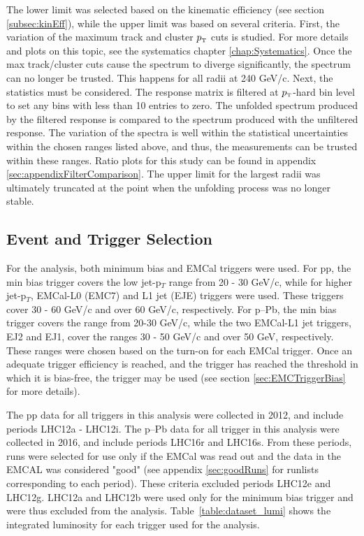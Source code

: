 \documentclass[ALICE]{ALICE_analysis_notes}
\newcommand{\pT}{$p_{\mbox{\tiny T}}$\xspace}
\newcommand{\pPb}{{\mbox{p--Pb}}\xspace}
\newcommand{\pp}{pp\xspace}
\begin{document}
The lower limit was selected based on the kinematic efficiency (see section \ref{subsec:kinEff}), while the upper limit was based on several criteria. First, the variation of the maximum track and cluster \pT cuts is studied. For more details and plots on this topic, see the systematics chapter \ref{chap:Systematics}. Once the max track/cluster cuts cause the spectrum to diverge significantly, the spectrum can no longer be trusted. This happens for all radii at 240 GeV/c. Next, the statistics must be considered. The response matrix is filtered at \pT-hard bin level to set any bins with less than 10 entries to zero. The unfolded spectrum produced by the filtered response is compared to the spectrum produced with the unfiltered response. The variation of the spectra is well within the statistical uncertainties within the chosen ranges listed above, and thus, the measurements can be trusted within these ranges. Ratio plots for this study can be found in appendix \ref{sec:appendixFilterComparison}. The upper limit for the largest radii was ultimately truncated at the point when the unfolding process was no longer stable.

\subsection{Event and Trigger Selection}
\label{sec:EvtTrgSel}

For the analysis, both minimum bias and EMCal triggers were used. For \pp, the min bias trigger covers the low jet-p$_T$ range from 20 - 30 GeV/c, while for higher jet-p$_T$, EMCal-L0 (EMC7) and L1 jet (EJE) triggers were used. These triggers cover 30 - 60 GeV/c and over 60 GeV/c, respectively. For \pPb, the min bias trigger covers the range from 20-30 GeV/c, while the two EMCal-L1 jet triggers, EJ2 and EJ1, cover the ranges 30 - 50 GeV/c and over 50 GeV, respectively.  These ranges were chosen based on the turn-on for each EMCal trigger. Once an adequate trigger efficiency is reached, and the trigger has reached the threshold in which it is bias-free, the trigger may be used (see section \ref{sec:EMCTriggerBias} for more details).

The \pp data for all triggers in this analysis were collected in 2012, and include periods LHC12a - LHC12i. The \pPb data for all trigger in this analysis were collected in 2016, and include periods LHC16r and LHC16s. From these periods, runs were selected for use only if the EMCal was read out and the data in the EMCAL was considered "good" (see appendix \ref{sec:goodRuns} for runlists corresponding to each period). These criteria excluded periods LHC12e and LHC12g. LHC12a and LHC12b were used only for the minimum bias trigger and were thus excluded from the analysis. Table~\ref{table:dataset_lumi} shows the integrated luminosity for each trigger used for the analysis.
\end{document}
